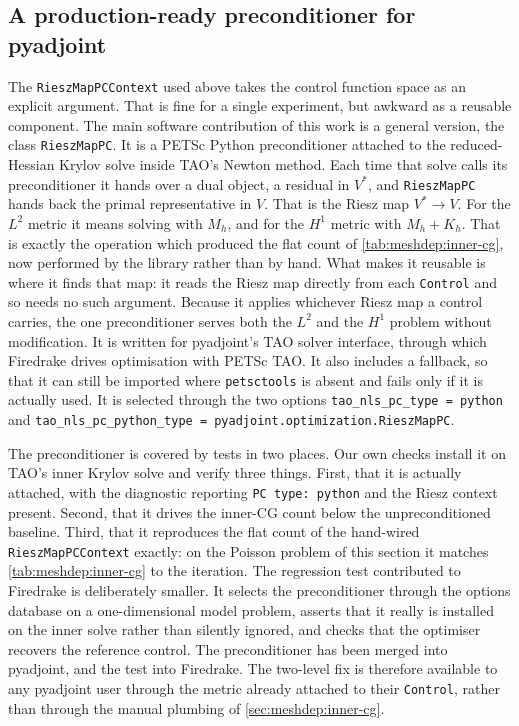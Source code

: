 \documentclass[a4paper,11pt]{article}
\theoremstyle{spacedplain} \newtheorem{theorem}[counter]{Theorem} \newtheorem{lemma}[counter]{Lemma} \newtheorem{prop}[counter]{Proposition} \newtheorem{cor}[counter]{Corollary}
\theoremstyle{spaceddefinition} \newtheorem{defn}[counter]{Definition} \newtheorem{example}[counter]{Example} \newtheorem{remark}[counter]{Remark}
\begin{document}
\subsection{A production-ready preconditioner for pyadjoint}
\label{sec:precond:pyadjoint}

The \texttt{RieszMapPCContext} used above takes the control function space as an explicit argument. That is fine for a single experiment, but awkward as a reusable component. The main software contribution of this work is a general version, the class \texttt{RieszMapPC}. It is a PETSc Python preconditioner attached to the reduced-Hessian Krylov solve inside TAO's Newton method. Each time that solve calls its preconditioner it hands over a dual object, a residual in $V^{*}$, and \texttt{RieszMapPC} hands back the primal representative in $V$. That is the Riesz map $V^{*}\to V$. For the $L^{2}$ metric it means solving with $M_h$, and for the $H^{1}$ metric with $M_h + K_h$. That is exactly the operation which produced the flat count of \cref{tab:meshdep:inner-cg}, now performed by the library rather than by hand. What makes it reusable is where it finds that map: it reads the Riesz map directly from each \texttt{Control} and so needs no such argument. Because it applies whichever Riesz map a control carries, the one preconditioner serves both the $L^{2}$ and the $H^{1}$ problem without modification. It is written for pyadjoint's TAO solver interface, through which Firedrake drives optimisation with PETSc TAO. It also includes a fallback, so that it can still be imported where \texttt{petsctools} is absent and fails only if it is actually used. It is selected through the two options \texttt{tao\_nls\_pc\_type = python} and \texttt{tao\_nls\_pc\_python\_type = pyadjoint.\allowbreak optimization.\allowbreak RieszMapPC}.

The preconditioner is covered by tests in two places. Our own checks install it on TAO's inner Krylov solve and verify three things. First, that it is actually attached, with the diagnostic reporting \texttt{PC type: python} and the Riesz context present. Second, that it drives the inner-CG count below the unpreconditioned baseline. Third, that it reproduces the flat count of the hand-wired \texttt{RieszMapPCContext} exactly: on the Poisson problem of this section it matches \cref{tab:meshdep:inner-cg} to the iteration. The regression test contributed to Firedrake is deliberately smaller. It selects the preconditioner through the options database on a one-dimensional model problem, asserts that it really is installed on the inner solve rather than silently ignored, and checks that the optimiser recovers the reference control. The preconditioner has been merged into pyadjoint, and the test into Firedrake. The two-level fix is therefore available to any pyadjoint user through the metric already attached to their \texttt{Control}, rather than through the manual plumbing of \cref{sec:meshdep:inner-cg}.
\end{document}
